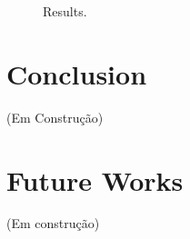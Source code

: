 \documentclass{vgtc}
\begin{document}
    \begin{figure}
        \begin{center}\end{center}
        \caption{Results.}
        \label{fig:result1}
    \end{figure}
    
    \section{Conclusion}\label{conclusion}

(Em Construção)

    \section{Future Works}\label{future-works}

(Em construção)


    
    



    
    
\end{document}
